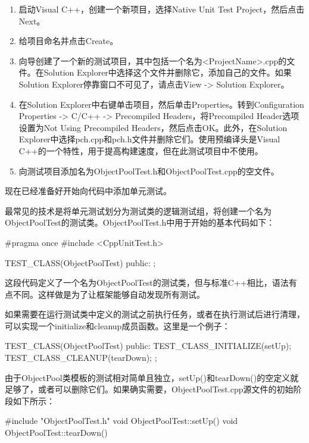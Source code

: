 \begin{enumerate}
\item
启动Visual C++，创建一个新项目，选择Native Unit Test Project，然后点击Next。

\item
给项目命名并点击Create。

\item
向导创建了一个新的测试项目，其中包括一个名为<ProjectName>.cpp的文件。在Solution Explorer中选择这个文件并删除它，添加自己的文件。如果Solution Explorer停靠窗口不可见了，请点击View -> Solution Explorer。

\item
在Solution Explorer中右键单击项目，然后单击Properties。转到Configuration Properties -> C/C++ -> Precompiled Headers，将Precompiled Header选项设置为Not Using Precompiled Headers，然后点击OK。此外，在Solution Explorer中选择pch.cpp和pch.h文件并删除它们。使用预编译头是Visual C++的一个特性，用于提高构建速度，但在此测试项目中不使用。

\item
向测试项目添加名为ObjectPoolTest.h和ObjectPoolTest.cpp的空文件。
\end{enumerate}

现在已经准备好开始向代码中添加单元测试。

最常见的技术是将单元测试划分为测试类的逻辑测试组，将创建一个名为ObjectPoolTest的测试类。ObjectPoolTest.h中用于开始的基本代码如下：

\begin{cpp}
#pragma once
#include <CppUnitTest.h>

TEST_CLASS(ObjectPoolTest)
{
    public:
};
\end{cpp}

这段代码定义了一个名为ObjectPoolTest的测试类，但与标准C++相比，语法有点不同。这样做是为了让框架能够自动发现所有测试。

如果需要在运行测试类中定义的测试之前执行任务，或者在执行测试后进行清理，可以实现一个initialize和cleanup成员函数。这里是一个例子：

\begin{cpp}
TEST_CLASS(ObjectPoolTest)
{
    public:
        TEST_CLASS_INITIALIZE(setUp);
        TEST_CLASS_CLEANUP(tearDown);
};
\end{cpp}

由于ObjectPool类模板的测试相对简单且独立，setUp()和tearDown()的空定义就足够了，或者可以删除它们。如果确实需要，ObjectPoolTest.cpp源文件的初始阶段如下所示：

\begin{cpp}
#include "ObjectPoolTest.h"
void ObjectPoolTest::setUp() { }
void ObjectPoolTest::tearDown() { }
\end{cpp}

